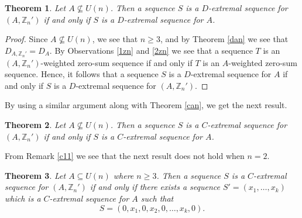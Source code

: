 \documentclass{article}[11pt]
\newtheorem{theorem}{Theorem}[section]
\theoremstyle{definition}
\begin{document}
\begin{theorem}\label{dad}
Let $A\nsubseteq U(n)$. Then a sequence $S$ is a $D$-extremal sequence for $(A,\mathbb Z_n')$ if and only if $S$ is a $D$-extremal sequence for $A$.
\end{theorem}

\begin{proof}
Since $A\nsubseteq U(n)$, we see that $n\geq 3$, and by Theorem \ref{dan} we see that $D_{A,\mathbb Z_n'}=D_A$. By Observations \ref{1zn} and \ref{2zn} we see that a sequence $T$ is an $(A,\mathbb Z_n')$-weighted zero-sum sequence if and only if $T$ is an $A$-weighted zero-sum sequence. Hence, it follows that a sequence $S$ is a $D$-extremal sequence for $A$ if and only if $S$ is a $D$-extremal sequence for $(A,\mathbb Z_n')$.
\end{proof}

By using a similar argument along with Theorem \ref{can}, we get the next result.


\begin{theorem}\label{cad}
Let $A\nsubseteq U(n)$. Then a sequence $S$ is a $C$-extremal sequence for $(A,\mathbb Z_n')$ if and only if $S$ is a $C$-extremal sequence for $A$.
\end{theorem}

From Remark \ref{c11} we see that the next result does not hold when $n=2$.

\begin{theorem}\label{ca'}
Let $A\subseteq U(n)$ where $n\geq 3$. Then a sequence $S$ is a $C$-extremal sequence for $(A,\mathbb Z_n')$ if and only if there exists a sequence $S'=(x_1,\ldots,x_k)$ which is a $C$-extremal sequence for $A$ such that
\begin{equation}\label{cex}
S=(0,x_1,0,x_2,0,\ldots,x_k,0).
\end{equation}
\end{theorem}
\end{document}
